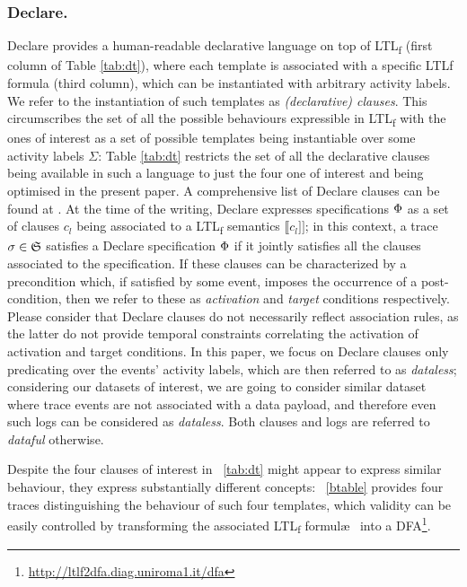 \documentclass[sigconf]{acmart}
\newcommand{\rrbraket}{\ensuremath{]\!]}}
\begin{document}
\subsubsection{Declare.} Declare \cite{4384001} provides a human-readable declarative language on top of LTL\textsubscript{f} (first column  of Table \ref{tab:dt}), where each template is associated with a specific LTL\textsf{f} formula (third column), which can be instantiated with arbitrary activity labels. We refer to the instantiation of such templates as \textit{(declarative) clauses}. This circumscribes the set of all the possible behaviours expressible in LTL\textsubscript{f} with the ones of interest as a set of possible templates being instantiable over some activity labels $\Sigma$: Table \ref{tab:dt} restricts the set of all the declarative clauses being available in such a language to just the four one of interest and being optimised in the present paper.  A comprehensive list of Declare clauses can be found at \cite{Li2020}. At the time of the writing, Declare expresses specifications $\Phi$ as a set of clauses $c_l$ being associated to a LTL\textsubscript{f} semantics $\llbracket c_l\rrbraket$; in this context, a trace $\sigma\in\mathfrak{S}$ satisfies a Declare specification $\Phi$ if it jointly satisfies all the clauses associated to the specification. If these clauses can be characterized by a precondition which, if satisfied by some event, imposes the occurrence of a post-condition, then we refer to these as \textit{activation} and \textit{target} conditions respectively. Please consider that Declare clauses do not necessarily reflect association rules, as the latter do not provide temporal constraints correlating the activation of activation and target conditions. In this paper, we focus on Declare clauses only predicating over the events' activity labels, which are then referred to as \textit{dataless}; considering our datasets of interest, we are going to consider similar dataset where trace events are not associated with a data payload, and therefore even such logs can be considered as \textit{dataless}. Both clauses and logs are referred to \textit{dataful} otherwise. 

Despite the four clauses of interest in \tablename~\ref{tab:dt} might appear to express similar behaviour, they express substantially different concepts: \tablename~\ref{btable} provides four traces distinguishing the behaviour of such four templates, which validity can be easily controlled by transforming the associated LTL\textsubscript{f} formul\ae~ into a DFA\footnote{\url{http://ltlf2dfa.diag.uniroma1.it/dfa}}.
\end{document}

